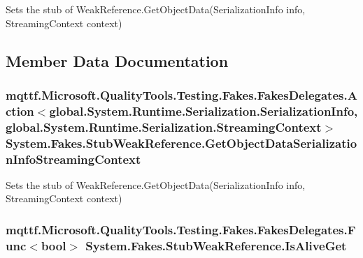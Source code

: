 Sets the stub of Weak\-Reference.\-Get\-Object\-Data(\-Serialization\-Info info, Streaming\-Context context)



\subsection{Member Data Documentation}
\hypertarget{class_system_1_1_fakes_1_1_stub_weak_reference_a41199bd1c5ea88c5c68144803c2ed42f}{
\subsubsection[{Get\-Object\-Data\-Serialization\-Info\-Streaming\-Context}]{\setlength{\rightskip}{0pt plus 5cm}mqttf.\-Microsoft.\-Quality\-Tools.\-Testing.\-Fakes.\-Fakes\-Delegates.\-Action$<$global.\-System.\-Runtime.\-Serialization.\-Serialization\-Info, global.\-System.\-Runtime.\-Serialization.\-Streaming\-Context$>$ System.\-Fakes.\-Stub\-Weak\-Reference.\-Get\-Object\-Data\-Serialization\-Info\-Streaming\-Context}}\label{class_system_1_1_fakes_1_1_stub_weak_reference_a41199bd1c5ea88c5c68144803c2ed42f}


Sets the stub of Weak\-Reference.\-Get\-Object\-Data(\-Serialization\-Info info, Streaming\-Context context)

\hypertarget{class_system_1_1_fakes_1_1_stub_weak_reference_af74da844b931e1e3fa109be1051c7815}{
\subsubsection[{Is\-Alive\-Get}]{\setlength{\rightskip}{0pt plus 5cm}mqttf.\-Microsoft.\-Quality\-Tools.\-Testing.\-Fakes.\-Fakes\-Delegates.\-Func$<$bool$>$ System.\-Fakes.\-Stub\-Weak\-Reference.\-Is\-Alive\-Get}}\label{class_system_1_1_fakes_1_1_stub_weak_reference_af74da844b931e1e3fa109be1051c7815}


